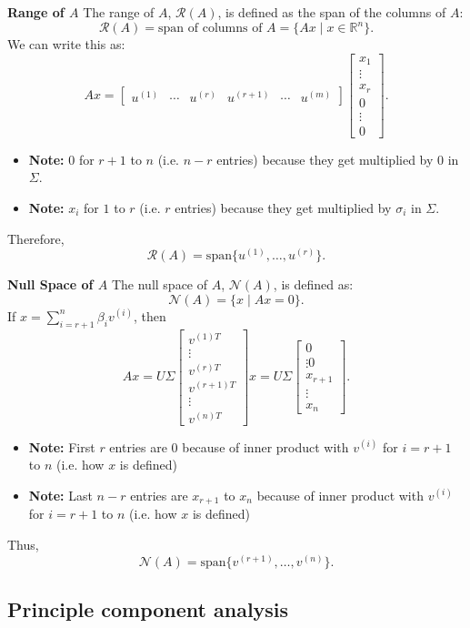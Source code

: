 \begin{derivation}
    \textbf{Range of \( A \)}
    The range of \( A \), \( \mathcal{R}(A) \), is defined as the span of the columns of \( A \):
    \[
    \mathcal{R}(A) = \text{span of columns of } A = \{ A x \mid x \in \mathbb{R}^n \}.
    \]
    We can write this as:
    \[
    A x = 
    \begin{bmatrix}
    u^{(1)} & \cdots & u^{(r)} & u^{(r+1)} & \cdots & u^{(m)}
    \end{bmatrix}
    \begin{bmatrix}
    x_1 \\
    \vdots \\
    x_r \\
    0 \\
    \vdots \\
    0
    \end{bmatrix}.
    \]
    \begin{itemize}
        \item \textbf{Note:} $0$ for $r+1$ to $n$ (i.e. $n-r$ entries) because they get multiplied by $0$ in $\Sigma$. 
        \item \textbf{Note:} $x_i$ for $1$ to $r$ (i.e. $r$ entries) because they get multiplied by $\sigma_i$ in $\Sigma$.
    \end{itemize}
    Therefore,
    \[
    \mathcal{R}(A) = \text{span} \{ u^{(1)}, \dots, u^{(r)} \}.
    \]
    \vspace{1em}

    \textbf{Null Space of \( A \)}
    The null space of \( A \), \( \mathcal{N}(A) \), is defined as:
    \[
    \mathcal{N}(A) = \{ x \mid A x = 0 \}.
    \]
    If \( x = \sum_{i=r+1}^n \beta_i v^{(i)} \), then
    \[
    A x = U \Sigma 
    \begin{bmatrix}
    v^{(1) T} \\
    \vdots \\
    v^{(r) T} \\
    v^{(r+1) T} \\
    \vdots \\
    v^{(n) T}
    \end{bmatrix} x =  U \Sigma \begin{bmatrix}
        0 \\
        \vdots 
        0 \\
        x_{r+1} \\
        \vdots \\
        x_n
        \end{bmatrix}.
    \]
    \begin{itemize}
        \item \textbf{Note:} First $r$ entries are $0$ because of inner product with $v^{(i)}$ for $i=r+1$ to $n$ (i.e. how $x$ is defined)
        \item \textbf{Note:} Last $n-r$ entries are $x_{r+1}$ to $x_n$ because of inner product with $v^{(i)}$ for $i=r+1$ to $n$ (i.e. how $x$ is defined)
    \end{itemize}
    Thus,
    \[
    \mathcal{N}(A) = \text{span} \{ v^{(r+1)}, \dots, v^{(n)} \}.
    \]
\end{derivation}

\begin{derivation}
\end{derivation}
\subsection{Principle component analysis}